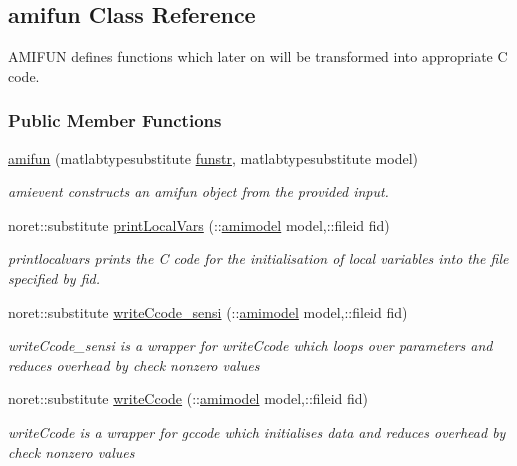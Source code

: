 \hypertarget{classamifun}{}\subsection{amifun Class Reference}
\label{classamifun}


A\+M\+I\+F\+U\+N defines functions which later on will be transformed into appropriate C code.  


\subsubsection*{Public Member Functions}
\begin{DoxyCompactItemize}
\item 
\hyperlink{classamifun_a609e744c18813bc24f360b8cc5150344}{amifun} (matlabtypesubstitute \hyperlink{classamifun_a484b54379bc8b29b6ce65d84966ea4c4}{funstr}, matlabtypesubstitute model)
\begin{DoxyCompactList}\small\item\em amievent constructs an amifun object from the provided input. \end{DoxyCompactList}\item 
noret\+::substitute \hyperlink{classamifun_a65387b406e8c310f20057ac62940dd2a}{print\+Local\+Vars} (\+::\hyperlink{classamimodel}{amimodel} model,\+::fileid fid)
\begin{DoxyCompactList}\small\item\em printlocalvars prints the C code for the initialisation of local variables into the file specified by fid. \end{DoxyCompactList}\item 
noret\+::substitute \hyperlink{classamifun_a7845c1193d9a963f7bb9802f1eeefac7}{write\+Ccode\+\_\+sensi} (\+::\hyperlink{classamimodel}{amimodel} model,\+::fileid fid)
\begin{DoxyCompactList}\small\item\em write\+Ccode\+\_\+sensi is a wrapper for write\+Ccode which loops over parameters and reduces overhead by check nonzero values \end{DoxyCompactList}\item 
noret\+::substitute \hyperlink{classamifun_a8e48f2842268ff64ca32db8eb4b69377}{write\+Ccode} (\+::\hyperlink{classamimodel}{amimodel} model,\+::fileid fid)
\begin{DoxyCompactList}\small\item\em write\+Ccode is a wrapper for gccode which initialises data and reduces overhead by check nonzero values \end{DoxyCompactList}\item 

\end{DoxyCompactItemize}
